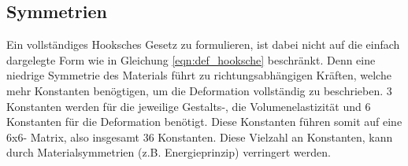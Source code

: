\subsection{Symmetrien}
Ein vollständiges Hooksches Gesetz zu formulieren, ist dabei nicht auf die einfach dargelegte Form wie 
in Gleichung \ref{eqn:def_hooksche} beschränkt.
Denn eine niedrige Symmetrie des Materials führt zu richtungsabhängigen Kräften, welche mehr Konstanten
benögtigen, um die Deformation vollständig zu beschrieben.
3 Konstanten werden für die jeweilige Gestalts-, die Volumenelastizität und 6 Konstanten für die Deformation benötigt.
Diese Konstanten führen somit auf eine 6x6- Matrix, also insgesamt 36 Konstanten.\newline
Diese Vielzahl an Konstanten, kann durch Materialsymmetrien (z.\;B. Energieprinzip) verringert werden.




